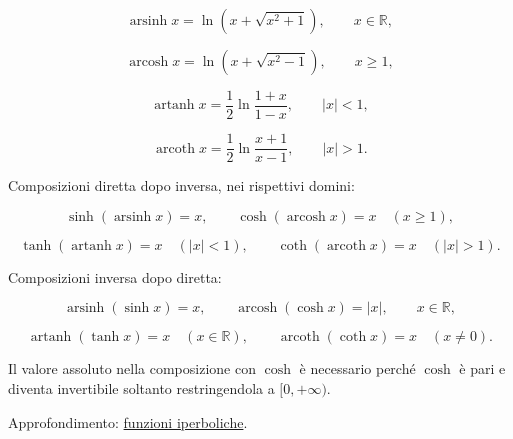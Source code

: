 \[
\operatorname{arsinh}x=\ln(x+\sqrt{x^2+1}),
\qquad x\in\mathbb R,
\]

\[
\operatorname{arcosh}x=\ln(x+\sqrt{x^2-1}),
\qquad x\ge1,
\]

\[
\operatorname{artanh}x=\frac12\ln\frac{1+x}{1-x},
\qquad |x|<1,
\]

\[
\operatorname{arcoth}x=\frac12\ln\frac{x+1}{x-1},
\qquad |x|>1.
\]

Composizioni diretta dopo inversa, nei rispettivi domini:

\[
\sinh(\operatorname{arsinh}x)=x,
\qquad
\cosh(\operatorname{arcosh}x)=x\quad(x\ge1),
\]

\[
\tanh(\operatorname{artanh}x)=x\quad(|x|<1),
\qquad
\coth(\operatorname{arcoth}x)=x\quad(|x|>1).
\]

Composizioni inversa dopo diretta:

\[
\operatorname{arsinh}(\sinh x)=x,
\qquad
\operatorname{arcosh}(\cosh x)=|x|,
\qquad x\in\mathbb R,
\]

\[
\operatorname{artanh}(\tanh x)=x\quad(x\in\mathbb R),
\qquad
\operatorname{arcoth}(\coth x)=x\quad(x\ne0).
\]

Il valore assoluto nella composizione con \(\cosh\) è necessario perché \(\cosh\) è pari e diventa invertibile soltanto restringendola a \([0,+\infty)\).

Approfondimento: \href{https://ingegnerismo.it/matematica/funzioni-iperboliche/}{funzioni iperboliche}.
